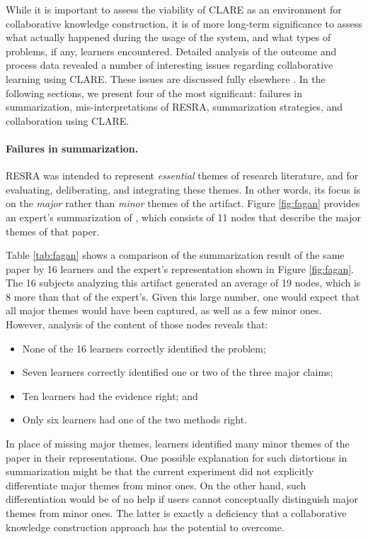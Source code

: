 While it is important to assess the viability of CLARE as an environment
for collaborative knowledge construction, it is of more long-term
significance to assess what actually happened during the usage of the
system, and what types of problems, if any, learners encountered.  Detailed
analysis of the outcome and process data revealed a number of interesting
issues regarding collaborative learning using CLARE.  These issues are
discussed fully elsewhere \cite{csdl-93-14}. In the following sections, we
present four of the most significant: failures in summarization,
mis-interpretations of RESRA, summarization strategies, and collaboration
using CLARE.


\paragraph{Failures in summarization.}

RESRA was intended to represent {\it essential\/} themes of research
literature, and for evaluating, deliberating, and integrating these
themes. In other words, its focus is on the {\it major} rather than {\it
minor\/} themes of the artifact. Figure \ref{fig:fagan} provides an
expert's summarization of \cite{Fagan76}, which consists of 11 nodes that
describe the major themes of that paper.

Table \ref{tab:fagan} shows a comparison of the summarization result of the
same paper by 16 learners and the expert's representation shown in Figure
\ref{fig:fagan}. The 16 subjects analyzing this artifact generated an
average of 19 nodes, which is 8 more than that of the expert's. Given this
large number, one would expect that all major themes would have been
captured, as well as a few minor ones. However, analysis of the content of
those nodes reveals that:

\begin{itemize}
\item None of the 16 learners correctly identified the problem;
  
\item Seven learners correctly identified one or two of the three
  major claims;
  
\item Ten learners had the evidence right; and
  
\item Only six learners had one of the two methods right.
\end{itemize}

In place of missing major themes, learners identified many minor themes of
the paper in their representations. One possible explanation for such
distortions in summarization might be that the current experiment did not
explicitly differentiate major themes from minor ones. On the other hand,
such differentiation would be of no help if users cannot conceptually
distinguish major themes from minor ones. The latter is exactly a
deficiency that a collaborative knowledge construction approach has the
potential to overcome.

